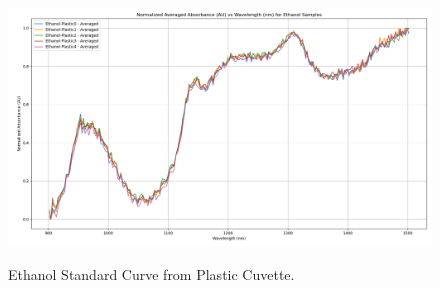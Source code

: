\documentclass[final, 3p, 11pt]{elsarticle}
\begin{document}
\newpage
\begin{figure}[h]
  \captionsetup{justification=raggedright, singlelinecheck=false, position=above}  %
  \caption{Ethanol Standard Curve from Plastic Cuvette.}
  \centering
  \includegraphics[width=\textwidth]{Images/Ethanol-Plastic_Standard.png}  %
  \label{fig:appendix_ethanol_plastic}
\end{figure}

\end{document}
